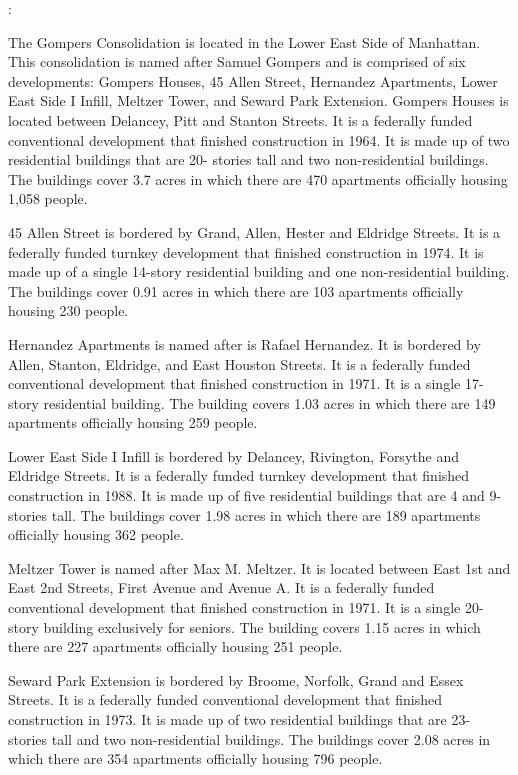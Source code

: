 :     

   

The Gompers Consolidation is located in the Lower East Side of Manhattan. This consolidation is named after Samuel Gompers and is comprised of six developments: Gompers Houses, 45 Allen Street, Hernandez Apartments, Lower East Side I Infill, Meltzer Tower, and Seward Park Extension. Gompers Houses is located between Delancey, Pitt and Stanton Streets. It is a federally funded conventional development that finished construction in 1964. It is made up of two residential buildings that are 20- stories tall and two non-residential buildings. The buildings cover 3.7 acres in which there are 470 apartments officially housing 1,058 people. 

45 Allen Street is bordered by Grand, Allen, Hester and Eldridge Streets. It is a federally funded turnkey development that finished construction in 1974. It is made up of a single 14-story residential building and one non-residential building. The buildings cover 0.91 acres in which there are 103 apartments officially housing 230 people. 

Hernandez Apartments is named after is Rafael Hernandez. It is bordered by Allen, Stanton, Eldridge, and East Houston Streets. It is a federally funded conventional development that finished construction in 1971. It is a single 17- story residential building. The building covers 1.03 acres in which there are 149 apartments officially housing 259 people. 

Lower East Side I Infill is bordered by Delancey, Rivington, Forsythe and Eldridge Streets. It is a federally funded turnkey development that finished construction in 1988. It is made up of five residential buildings that are 4 and 9- stories tall. The buildings cover 1.98 acres in which there are 189 apartments officially housing 362 people. 

Meltzer Tower is named after Max M. Meltzer. It is located between East 1st and East 2nd Streets, First Avenue and Avenue A. It is a federally funded conventional development that finished construction in 1971. It is a single 20-story building exclusively for seniors. The building covers 1.15 acres in which there are 227 apartments officially housing 251 people. 

Seward Park Extension is bordered by Broome, Norfolk, Grand and Essex Streets. It is a federally funded conventional development that finished construction in 1973. It is made up of two residential buildings that are 23- stories tall and two non-residential buildings. The buildings cover 2.08 acres in which there are 354 apartments officially housing 796 people. 